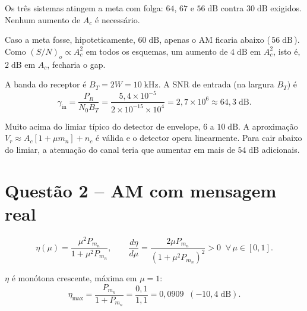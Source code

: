 \documentclass[11pt,a4paper]{article}
\begin{document}
\begin{resolucao}

Os três sistemas atingem a meta com folga: $64$, $67$ e $56\;\text{dB}$ contra $30\;\text{dB}$ exigidos. Nenhum aumento de $A_c$ é necessário.

Caso a meta fosse, hipoteticamente, $60\;\text{dB}$, apenas o AM ficaria abaixo (\,$56\;\text{dB}$\,). Como $(S/N)_o \propto A_c^2$ em todos os esquemas, um aumento de $4\;\text{dB}$ em $A_c^2$, isto é, $2\;\text{dB}$ em $A_c$, fecharia o gap.
\end{resolucao}

\begin{resolucao}

A banda do receptor é $B_T = 2W = 10\;\text{kHz}$. A SNR de entrada (na largura $B_T$) é
\[
  \gamma_{\text{in}} = \frac{P_R}{N_0 B_T} = \frac{5{,}4\times 10^{-5}}{2\times 10^{-15}\times 10^4} = 2{,}7\times 10^6 \approx 64{,}3\;\text{dB}.
\]

Muito acima do limiar típico do detector de envelope, $6$ a $10\;\text{dB}$. A aproximação $V_r \approx A_c[1 + \mu m_n] + n_c$ é válida e o detector opera linearmente. Para cair abaixo do limiar, a atenuação do canal teria que aumentar em mais de $54\;\text{dB}$ adicionais.
\end{resolucao}

\section*{Questão 2 -- AM com mensagem real}

\begin{resolucao}

\[
  \eta(\mu) = \frac{\mu^2 P_{m_n}}{1 + \mu^2 P_{m_n}}, \qquad
  \frac{d\eta}{d\mu} = \frac{2\mu P_{m_n}}{(1 + \mu^2 P_{m_n})^2} > 0\;\;\forall\,\mu \in [0,1].
\]

$\eta$ é monótona crescente, máxima em $\mu = 1$:
\[
  \eta_{\max} = \frac{P_{m_n}}{1 + P_{m_n}} = \frac{0{,}1}{1{,}1} = \boxed{0{,}0909 \;\;(-10{,}4\;\text{dB}).}
\]
\end{resolucao}
\end{document}
